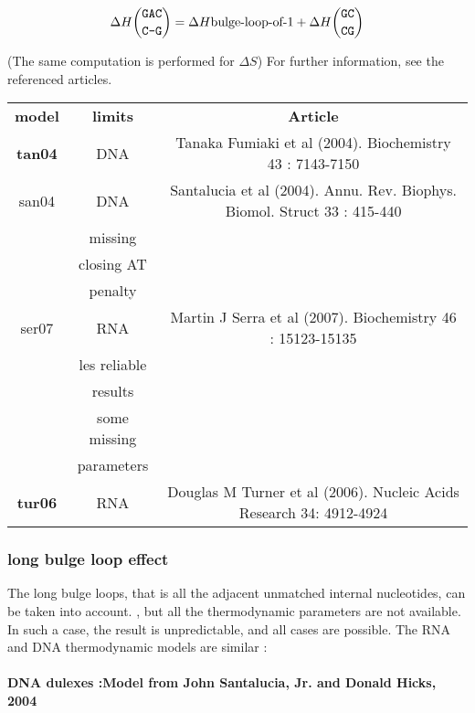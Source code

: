 \documentclass{article}
\begin{document}
\begin{multline*}
\Delta H {\mbox{\texttt{GAC}} \choose \mbox{\texttt{C-G}}} =
\Delta H {\mbox{bulge-loop-of-1}} +
\Delta H {\mbox{\texttt{GC}} \choose \mbox{\texttt{CG}}} \\
\end{multline*}

       (The same computation is performed for $\Delta S$) 
For further information, see the referenced articles.

\begin{table}[h]
\begin{tabular}[h]{| c | c | c |}
\textbf{model} & \textbf{limits} & \textbf{Article} \\
\textbf{tan04} & DNA & Tanaka Fumiaki et al (2004). Biochemistry 43 : 7143-7150 \\
san04 & DNA & Santalucia et al (2004). Annu. Rev. Biophys. Biomol. Struct 33 : 415-440\\
 & missing & \\
 & closing AT & \\
 & penalty & \\
ser07 & RNA & Martin J Serra et al (2007). Biochemistry 46 : 15123-15135 \\
 & les reliable & \\
 & results & \\
 & some missing & \\
 & parameters & \\
\textbf{tur06} & RNA & Douglas M Turner et al (2006). Nucleic Acids Research 34: 4912-4924 \\
\end{tabular}
\end{table}

\subsubsection{long bulge loop effect}

The long bulge loops, that is all the adjacent unmatched internal nucleotides, can be taken into
account. , but all the thermodynamic parameters are not available. In such a case, 
the result is unpredictable, and all cases are possible. 
The RNA and DNA thermodynamic models are similar : 
  
\paragraph{DNA dulexes :\textbf{Model from John Santalucia, Jr. and Donald Hicks, 2004}} 
\end{document}

